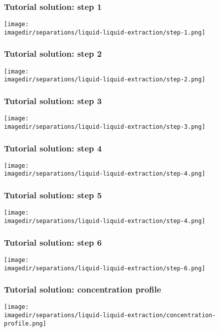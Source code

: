 \begin{frame}\frametitle{Tutorial solution: step 1}
	\begin{center}
		\texttt{[image: \\imagedir/separations/liquid-liquid-extraction/step-1.png]}
	\end{center}
\end{frame}

\begin{frame}\frametitle{Tutorial solution: step 2}
	\begin{center}
		\texttt{[image: \\imagedir/separations/liquid-liquid-extraction/step-2.png]}
	\end{center}
\end{frame}

\begin{frame}\frametitle{Tutorial solution: step 3}
	\begin{center}
		\texttt{[image: \\imagedir/separations/liquid-liquid-extraction/step-3.png]}
	\end{center}
\end{frame}

\begin{frame}\frametitle{Tutorial solution: step 4}
	\begin{center}
		\texttt{[image: \\imagedir/separations/liquid-liquid-extraction/step-4.png]}
	\end{center}
\end{frame}

\begin{frame}\frametitle{Tutorial solution: step 5}
	\begin{center}
		\texttt{[image: \\imagedir/separations/liquid-liquid-extraction/step-4.png]}
	\end{center}
\end{frame}

\begin{frame}\frametitle{Tutorial solution: step 6}
	\begin{center}
		\texttt{[image: \\imagedir/separations/liquid-liquid-extraction/step-6.png]}
	\end{center}
\end{frame}

\begin{frame}\frametitle{Tutorial solution: concentration profile}
	\begin{center}
		\texttt{[image: \\imagedir/separations/liquid-liquid-extraction/concentration-profile.png]}
	\end{center}
\end{frame}

